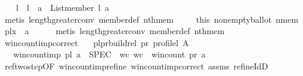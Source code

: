 \begin{isabellebody}
\ \ \isamarkupfalse%
\ {\isachardoublequoteopen}l{\isasymnoteq}{\isacharbrackleft}{\kern0pt}{\isacharbrackright}{\kern0pt}\ {\isasymand}\ {\isacharparenleft}{\kern0pt}l{\isacharbang}{\kern0pt}{}\ {\isacharequal}{\kern0pt}\ a{\isacharparenright}{\kern0pt}\ {\isasymlongrightarrow}\ List{\isachardot}{\kern0pt}member\ l\ a{\isachardoublequoteclose}\isanewline
\ \ \ \ \isamarkupfalse%
\ {\isacharparenleft}{\kern0pt}metis\ length{\isacharunderscore}{\kern0pt}greater{\isacharunderscore}{\kern0pt}{}{\isacharunderscore}{\kern0pt}conv\ member{\isacharunderscore}{\kern0pt}def\ nth{\isacharunderscore}{\kern0pt}mem{\isacharparenright}{\kern0pt}\ \isanewline
\ \ \isamarkupfalse%
\ this\ nonempty{\isacharunderscore}{\kern0pt}ballot\ nmem\ \isamarkupfalse%
\ {\isachardoublequoteopen}pl{\isacharbang}{\kern0pt}x{}{\isacharbang}{\kern0pt}{}\ {\isasymnoteq}\ a{\isachardoublequoteclose}\isanewline
\ \ \ \ \isamarkupfalse%
\ {\isacharparenleft}{\kern0pt}metis\ length{\isacharunderscore}{\kern0pt}greater{\isacharunderscore}{\kern0pt}{}{\isacharunderscore}{\kern0pt}conv\ member{\isacharunderscore}{\kern0pt}def\ nth{\isacharunderscore}{\kern0pt}mem{\isacharparenright}{\kern0pt}\isanewline
{}\isamarkupfalse%
%
\endisatagproof
{\isafoldproof}%
%
\isadelimproof
\isanewline
%
\endisadelimproof
\isanewline
{}\isamarkupfalse%
\ win{\isacharunderscore}{\kern0pt}count{\isacharunderscore}{\kern0pt}imp{\isacharprime}{\kern0pt}{\isacharunderscore}{\kern0pt}correct{\isacharcolon}{\kern0pt}\isanewline
\ \ \ {\isachardoublequoteopen}{\isacharparenleft}{\kern0pt}pl{\isacharcomma}{\kern0pt}pr{\isacharparenright}{\kern0pt}{\isasymin}build{\isacharunderscore}{\kern0pt}rel\ pr{}{\isacharunderscore}{\kern0pt}{\isasymalpha}\ {\isacharparenleft}{\kern0pt}profile{\isacharunderscore}{\kern0pt}l\ A{\isacharparenright}{\kern0pt}{\isachardoublequoteclose}\isanewline
\ \ \ {\isachardoublequoteopen}win{\isacharunderscore}{\kern0pt}count{\isacharunderscore}{\kern0pt}imp{\isacharprime}{\kern0pt}\ pl\ a\ {\isasymle}\ SPEC\ {\isacharparenleft}{\kern0pt}{\isasymlambda}\ wc{\isachardot}{\kern0pt}\ wc\ {\isacharequal}{\kern0pt}\ win{\isacharunderscore}{\kern0pt}count\ pr\ a{\isacharparenright}{\kern0pt}{\isachardoublequoteclose}\isanewline
%
\isadelimproof
\ \ %
\endisadelimproof
%
\isatagproof
{}\isamarkupfalse%
\ ref{\isacharunderscore}{\kern0pt}two{\isacharunderscore}{\kern0pt}step{\isacharbrackleft}{\kern0pt}OF\ win{\isacharunderscore}{\kern0pt}count{\isacharunderscore}{\kern0pt}imp{\isacharprime}{\kern0pt}{\isacharunderscore}{\kern0pt}refine\ win{\isacharunderscore}{\kern0pt}count{\isacharunderscore}{\kern0pt}imp{\isacharunderscore}{\kern0pt}correct{\isacharbrackright}{\kern0pt}\ assms\ refine{\isacharunderscore}{\kern0pt}IdD\isanewline

\end{isabellebody}
